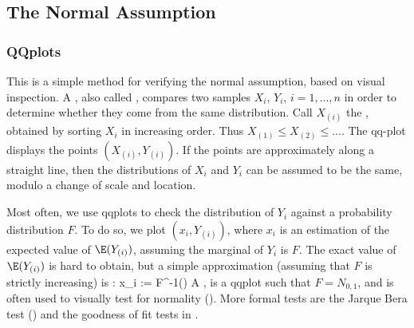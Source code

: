 \subsection{The Normal Assumption}
\label{sec-normal-assumption}


\subsubsection{QQplots}  This is a simple method for verifying the
normal assumption, based on visual inspection.
A , also called , compares two
samples $X_i$, $Y_i$, $i=1,...,n$ in order to determine whether
they come from the same distribution. Call $X_{(i)}$ the
, obtained by sorting $X_i$ in increasing
order. Thus $X_{(1)}\leq X_{(2)}\leq ...$. The qq-plot displays
the points $(X_{(i)}, Y_{(i)})$. If the points are
approximately along a straight line, then the distributions of
$X_i$ and $Y_i$ can be assumed to be the same, modulo a change
of scale and location.

Most often, we use qqplots to check the distribution of $Y_i$
against a probability distribution $F$. To do so, we plot
$(x_i, Y_{(i)})$, where $x_i$ is an estimation of the expected
value of $\E(Y_{(i)})$, assuming the marginal of $Y_i$ is $F$.
The exact value of $\E(Y_{(i)})$ is hard to obtain, but a
simple approximation (assuming that $F$ is strictly increasing)
is \cite{davison2003sm}:
 \ben x_i := F^{-1}\left(\right)
 \een
A , is a qqplot such that $F=N_{0,1}$, and
is often used to visually test for normality
(). More formal tests are the Jarque Bera
test () and the goodness of fit tests in
.
%
%
%
\begin{figure}
\center
%
\end{figure}



